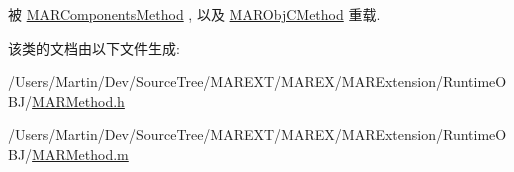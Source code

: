 被 \hyperlink{interface_m_a_r_components_method_ae5775c8f2ea6bcec3aede94d80986c91}{M\+A\+R\+Components\+Method} , 以及 \hyperlink{interface_m_a_r_obj_c_method_a2c706d26be0104fb5c705f2e30b2c7c4}{M\+A\+R\+Obj\+C\+Method} 重载.



该类的文档由以下文件生成\+:\begin{DoxyCompactItemize}
\item 
/\+Users/\+Martin/\+Dev/\+Source\+Tree/\+M\+A\+R\+E\+X\+T/\+M\+A\+R\+E\+X/\+M\+A\+R\+Extension/\+Runtime\+O\+B\+J/\hyperlink{_m_a_r_method_8h}{M\+A\+R\+Method.\+h}\item 
/\+Users/\+Martin/\+Dev/\+Source\+Tree/\+M\+A\+R\+E\+X\+T/\+M\+A\+R\+E\+X/\+M\+A\+R\+Extension/\+Runtime\+O\+B\+J/\hyperlink{_m_a_r_method_8m}{M\+A\+R\+Method.\+m}\end{DoxyCompactItemize}
